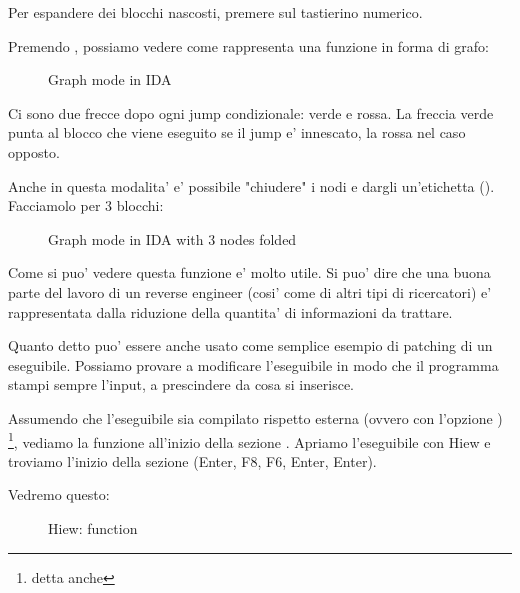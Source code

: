 Per espandere dei blocchi nascosti, premere \q{+} sul tastierino numerico.

\clearpage
Premendo , possiamo vedere come \IDA rappresenta una funzione in forma di grafo:

\begin{figure}[H]
\centering
{}
\caption{Graph mode in IDA}
\label{fig:ex3_IDA_1}
\end{figure}

Ci sono due frecce dopo ogni jump condizionale: verde e rossa.
La freccia verde punta al blocco che viene eseguito se il jump e' innescato, la rossa nel caso opposto.

\clearpage
Anche in questa modalita' e' possibile "chiudere" i nodi e dargli un'etichetta ().
Facciamolo per 3 blocchi:

\begin{figure}[H]
\centering
{}
\caption{Graph mode in IDA with 3 nodes folded}
\label{fig:ex3_IDA_2}
\end{figure}

Come si puo' vedere questa funzione e' molto utile.
Si puo' dire che una buona parte del lavoro di un reverse engineer (cosi' come di altri tipi di ricercatori) e' rappresentata dalla riduzione della quantita' di informazioni da trattare.



\clearpage
{}

Quanto detto puo' essere anche usato come semplice esempio di patching di un eseguibile.
Possiamo provare a modificare l'eseguibile in modo che il programma stampi sempre l'input, a prescindere da cosa si inserisce.

Assumendo che l'eseguibile sia compilato rispetto  esterna (ovvero con l'opzione )
\footnote{detta anche }, 
vediamo la funzione \main all'inizio della sezione .
Apriamo l'eseguibile con Hiew e troviamo l'inizio della sezione  (Enter, F8, F6, Enter, Enter).

Vedremo questo:

\begin{figure}[H]
\centering
{}
\caption{Hiew: \main function}
\label{fig:scanf_ex3_hiew_1}
\end{figure}

